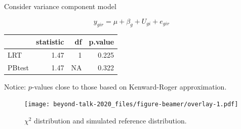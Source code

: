\documentclass[
  ignorenonframetext,
]{beamer}
\begin{document}
\begin{frame}

Consider variance component model

\[
y_{gir} = \mu + \beta_g + U_{gi} + e_{gir}
\]

\small

\begin{table}[!h]
\centering
\begin{tabular}{lrrr}
\toprule
  & statistic & df & p.value\\
\midrule
LRT & 1.47 & 1 & 0.225\\
PBtest & 1.47 & NA & 0.322\\
\bottomrule
\end{tabular}
\end{table}

\normalsize

Notice: \(p\)-values close to those based on Kenward-Roger
approximation.

\end{frame}

\begin{frame}

\small

\begin{figure}
\centering
\texttt{[image: beyond-talk-2020\_files/figure-beamer/overlay-1.pdf]}
\caption{\(\chi^2\) distribution and simulated reference distribution.}
\end{figure}

\normalsize

\end{frame}
\end{document}
